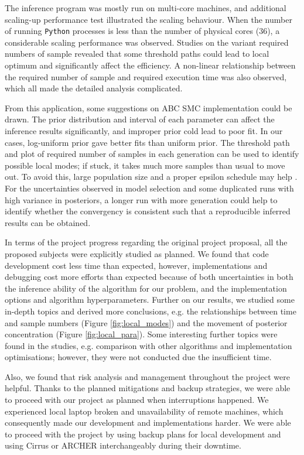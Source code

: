  The inference program was mostly run on multi-core machines, and additional scaling-up performance test illustrated the scaling behaviour. When the number of running \verb|Python| processes is less than the number of physical cores (36), a considerable scaling performance was observed. Studies on the variant required numbers of sample revealed that some threshold paths could lead to local optimum and significantly affect the efficiency. A non-linear relationship between the required number of sample and required execution time was also observed, which all made the detailed analysis complicated. 


 From this application, some suggestions on ABC SMC implementation could be drawn. The prior distribution and interval of each parameter can affect the inference results significantly, and improper prior cold lead to poor fit. In our cases, log-uniform prior gave better fits than uniform prior. The threshold path and plot of required number of samples in each generation can be used to identify possible local modes; if stuck, it takes much more samples than usual to move out. To avoid this, large population size and a proper epsilon schedule may help \cite{threshold}. For the uncertainties observed in model selection and some duplicated runs with high variance in posteriors, a longer run with more generation could help to identify whether the convergency is consistent such that a reproducible inferred results can be obtained.


In terms of the project progress regarding the original project proposal, all the proposed subjects were explicitly studied as planned. We found that code development cost less time than expected, however, implementations and debugging cost more efforts than expected because of both uncertainties in both the inference ability of the algorithm for our problem, and the implementation options and algorithm hyperparameters. Further on our results, we studied some in-depth topics and derived more conclusions, e.g. the relationships between time and sample numbers (Figure \ref{fig:local_modes}) and the movement of posterior concentration (Figure \ref{fig:local_para}). Some interesting further topics were found in the studies, e.g. comparison with other algorithms and implementation optimisations; however, they were not conducted due the insufficient time.

Also, we found that risk analysis and management throughout the project were helpful. Thanks to the planned mitigations and backup strategies, we were able to proceed with our project as planned when interruptions happened. We experienced local laptop broken and unavailability of remote machines, which consequently made our development and implementations harder. We were able to proceed with the project by using backup plans for local development and using Cirrus or ARCHER interchangeably during their downtime.

